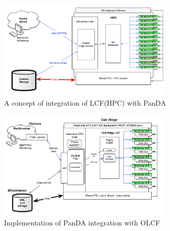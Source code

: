 \begin{figure}
  \includegraphics[width=0.75\textwidth]{images/Figure_4.png}
\caption{A concept of integration of LCF(HPC) with PanDA}
\label{fig:integration}
\end{figure}

\begin{figure}
  \includegraphics[width=0.75\textwidth]{images/Figure_5.png}
\caption{Implementation of PanDA integration with OLCF}
\label{fig:implementation}
\end{figure}

